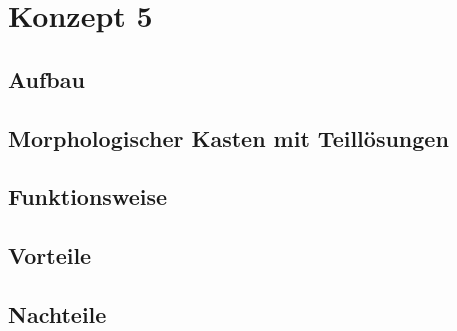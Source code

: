 \section{Konzept 5}

\subsection{Aufbau}

\subsection{Morphologischer Kasten mit Teill\"{o}sungen}

\subsection{Funktionsweise}

\subsection{Vorteile}

\subsection{Nachteile}
